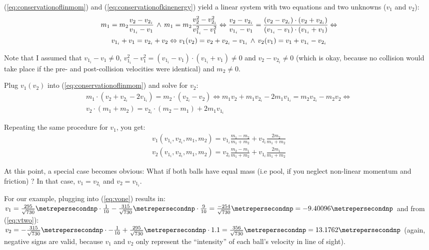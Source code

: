 \documentclass[math,plainoldenumerate,afour]{homework}
\begin{document}
(\ref{eq:conservationoflinmom}) and (\ref{eq:conservationofkinenergy})
yield a linear system with two equations and two unknowns ($v_1$ and $v_2$):
\begin{multline*}
  m_1 = m_2\frac{v_2-v_{2_i}}{v_{1_i}-v_1}
  \,\wedge\,
  m_1 = m_2\frac{v_2^2-v_{2_i}^2}{v_{1_i}^2-v_1^2}
  \Leftrightarrow
  \frac{v_2-v_{2_i}}{v_{1_i}-v_1}
  = \frac{(v_2-v_{2_i})\cdot(v_2+v_{2_i})}{(v_{1_i}-v_1)\cdot(v_{1_i}+v_1)}
  \Leftrightarrow \\
  v_{1_i}+v_1 = v_{2_i}+v_2
  \Leftrightarrow
  v_1(v_2) = v_2+v_{2_i}-v_{1_i}\,\wedge\,
  v_2(v_1) = v_1+v_{1_i}-v_{2_i}
\end{multline*}

Note that I assumed that $v_{1_i}-v_1\not=0$, $v_{1_i}^2-v_1^2 =
(v_{1_i}-v_1)\cdot(v_{1_i}+v_1)\not=0$ and $v_2-v_{2_i}\not = 0$ (which is
okay, because no collision would take place if the pre- and post-collision
velocities were identical) and $m_2\not = 0$.

Plug $v_1(v_2)$ into (\ref{eq:conservationoflinmom}) and solve for $v_2$:
\begin{equation*}
  \begin{split}
    m_1\cdot(v_2+v_{2_i}-2v_{1_i})=m_2\cdot(v_{2_i}-v_2)
    \Leftrightarrow
    m_1v_2 +m_1v_{2_i}-2m_1v_{1_i}=m_2v_{2_i}-m_2v_2
    \Leftrightarrow \\
    v_2\cdot(m_1+m_2)=v_{2_i}\cdot(m_2-m_1)+2m_1v_{1_i}
  \end{split}
\end{equation*}

Repeating the same procedure for $v_1$, you get:
\begin{gather}
  \label{eq:vone}
  v_1(v_{1_i},v_{2_i},m_1,m_2)=
  v_{1_i}\frac{m_1-m_2}{m_1+m_2}+v_{2_i}\frac{2m_2}{m_1+m_2} \\
  \label{eq:vtwo}
  v_2(v_{1_i},v_{2_i},m_1,m_2)=
  v_{2_i}\frac{m_2-m_1}{m_1+m_2}+v_{1_i}\frac{2m_1}{m_1+m_2}
\end{gather}

At this point, a special case becomes obvious: What if both balls
have equal mass (i.e pool, if you neglect non-linear momentum and friction) ?
In that case, $v_1=v_{2_i}$ and $v_2=v_{1_i}$.

For our example, plugging into (\ref{eq:vone}) results in: \\
$v_1=\frac{295}{\sqrt{730}}\metrepersecondnp\cdot\frac{1}{10}
-\frac{315}{\sqrt{730}}\metrepersecondnp\cdot\frac{9}{10}
=\frac{-254}{\sqrt{730}}\metrepersecondnp=-9.40096\metrepersecondnp$
and from (\ref{eq:vtwo}): \\
$v_2=-\frac{315}{\sqrt{730}}\metrepersecondnp\cdot-\frac{1}{10}+
\frac{295}{\sqrt{730}}\metrepersecondnp\cdot 1.1
=\frac{356}{\sqrt{730}}\metrepersecondnp=13.1762\metrepersecondnp$
(again, negative signs are valid, because $v_1$ and $v_2$ only 
represent the ``intensity'' of each ball's velocity in line of sight).
\end{document}
